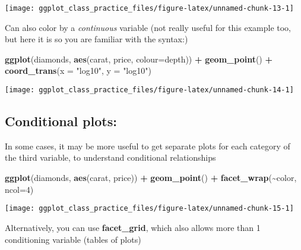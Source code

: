 \documentclass[
]{article}
\newenvironment{Shaded}{\begin{snugshade}}{\end{snugshade}}
\newcommand{\AttributeTok}[1]{\textcolor[rgb]{0.13,0.29,0.53}{#1}}
\newcommand{\DecValTok}[1]{\textcolor[rgb]{0.00,0.00,0.81}{#1}}
\newcommand{\FunctionTok}[1]{\textcolor[rgb]{0.13,0.29,0.53}{\textbf{#1}}}
\newcommand{\NormalTok}[1]{#1}
\newcommand{\SpecialCharTok}[1]{\textcolor[rgb]{0.81,0.36,0.00}{\textbf{#1}}}
\newcommand{\StringTok}[1]{\textcolor[rgb]{0.31,0.60,0.02}{#1}}
\begin{document}
\begin{center}\texttt{[image: ggplot\_class\_practice\_files/figure-latex/unnamed-chunk-13-1]} \end{center}

Can also color by a \emph{continuous} variable (not really useful for
this example too, but here it is so you are familiar with the syntax:)

\begin{Shaded}
\begin{Highlighting}[]
\FunctionTok{ggplot}\NormalTok{(diamonds, }\FunctionTok{aes}\NormalTok{(carat, price, }\AttributeTok{colour=}\NormalTok{depth)) }\SpecialCharTok{+} \FunctionTok{geom\_point}\NormalTok{() }\SpecialCharTok{+} 
    \FunctionTok{coord\_trans}\NormalTok{(}\AttributeTok{x =} \StringTok{"log10"}\NormalTok{, }\AttributeTok{y =} \StringTok{"log10"}\NormalTok{)}
\end{Highlighting}
\end{Shaded}

\begin{center}\texttt{[image: ggplot\_class\_practice\_files/figure-latex/unnamed-chunk-14-1]} \end{center}

\hypertarget{conditional-plots}{%
\subsection{Conditional plots:}\label{conditional-plots}}

In some cases, it may be more useful to get separate plots for each
category of the third variable, to understand conditional relationships

\begin{Shaded}
\begin{Highlighting}[]
\FunctionTok{ggplot}\NormalTok{(diamonds, }\FunctionTok{aes}\NormalTok{(carat, price)) }\SpecialCharTok{+} \FunctionTok{geom\_point}\NormalTok{() }\SpecialCharTok{+}
  \FunctionTok{facet\_wrap}\NormalTok{(}\SpecialCharTok{\textasciitilde{}}\NormalTok{color, }\AttributeTok{ncol=}\DecValTok{4}\NormalTok{)}
\end{Highlighting}
\end{Shaded}

\begin{center}\texttt{[image: ggplot\_class\_practice\_files/figure-latex/unnamed-chunk-15-1]} \end{center}

Alternatively, you can use \textbf{facet\_grid}, which also allows more
than 1 conditioning variable (tables of plots)
\end{document}
